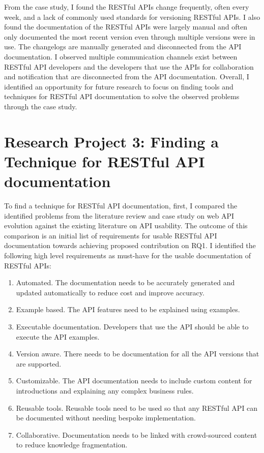 \documentclass[11pt,oneside]{book}
\begin{document}
From the case study, I found the RESTful APIs change frequently, often every week, and a lack of commonly used standards for versioning RESTful APIs. I also found the documentation of the RESTful APIs were largely manual and often only documented the most recent version even through multiple versions were in use. The changelogs are manually generated and disconnected from the API documentation. I observed multiple communication channels exist between RESTful API developers and the developers that use the APIs for collaboration and notification that are disconnected from the API documentation. Overall, I identified an opportunity for future research to focus on finding tools and techniques for RESTful API documentation to solve the observed problems through the case study.

\section{Research Project 3: Finding a Technique for RESTful API documentation}

To find a technique for RESTful API documentation, first, I compared the identified problems from the literature review and case study on web API evolution against the existing literature on API usability. The outcome of this comparison is an initial list of requirements for usable RESTful API documentation towards achieving proposed contribution on RQ1. I identified the following high level requirements as must-have for the usable documentation of RESTful APIs:

\begin{enumerate}[label=\textbf{R\arabic*}]
  \item Automated. The documentation needs to be accurately generated and updated automatically to reduce cost and improve accuracy.
  \item Example based. The API features need to be explained using examples.
\item   Executable documentation. Developers that use the API should be able to execute the API examples.
\item   Version aware. There needs to be documentation for all the API versions that are supported.
\item   Customizable. The API documentation needs to include custom content for introductions and explaining any complex business rules.
\item   Reusable tools. Reusable tools need to be used so that any RESTful API can be documented without needing bespoke implementation.
\item   Collaborative. Documentation needs to be linked with crowd-sourced content to reduce knowledge fragmentation.
\end{enumerate}
\end{document}
